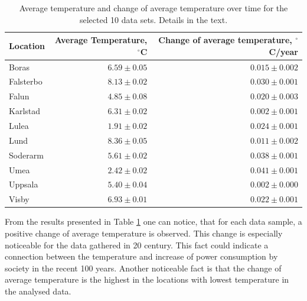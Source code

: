 \documentclass[a4paper,12pt]{article}
\begin{document}
\begin{table}
    \centering
    \begin{tabular}{lrr}
Location& Average Temperature, $^\circ$C& Change of average temperature, $^\circ$C/year\\
\hline
Boras&    $6.59\pm0.05$&                  $0.015\pm0.002$\\
Falsterbo&$8.13\pm0.02$&                  $0.030\pm0.001$\\
Falun&    $4.85\pm0.08$&                  $0.020\pm0.003$\\
Karlstad& $6.31\pm0.02$&                  $0.002\pm0.001$\\
Lulea&    $1.91\pm0.02$&                  $0.024\pm0.001$\\
Lund&     $8.36\pm0.05$&                  $0.011\pm0.002$\\
Soderarm& $5.61\pm0.02$&                  $0.038\pm0.001$\\
Umea&     $2.42\pm0.02$&                  $0.041\pm0.001$\\
Uppsala&  $5.40\pm0.04$&                  $0.002\pm0.000$\\
Visby&    $6.93\pm0.01$&                  $0.022\pm0.001$\\
\hline
    \end{tabular}
    \caption{Average temperature and change of average temperature over time for the selected 10 data sets.
    Details in the text.}
    \label{tab:tempr_trend}
\end{table}

From the results presented in Table \ref{tab:tempr_trend} one can notice, that for each data sample, a positive
change of average temperature is observed. This change is especially noticeable for the data gathered in 20 century.
This fact could indicate a connection between the temperature and increase of power consumption by society in
the recent 100 years. Another noticeable fact is that the change of average temperature is the highest in the 
locations with lowest temperature in the analysed data.
\end{document}
